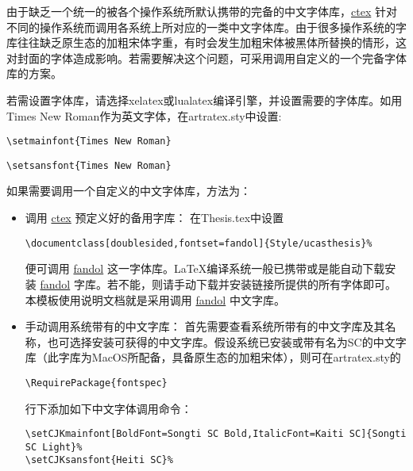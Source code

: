 \begin{enumerate}
        由于缺乏一个统一的被各个操作系统所默认携带的完备的中文字体库，\href{https://ctan.org/pkg/ctex?lang=en}{ctex} 针对不同的操作系统而调用各系统上所对应的一类中文字体库。由于很多操作系统的字库往往缺乏原生态的加粗宋体字重，有时会发生加粗宋体被黑体所替换的情形，这对封面的字体造成影响。若需要解决这个问题，可采用调用自定义的一个完备字体库的方案。
        
        若需设置字体库，请选择xelatex或lualatex编译引擎，并设置需要的字体库。如用Times New Roman作为英文字体，在artratex.sty中设置:

                 \verb|\setmainfont{Times New Roman}|

                 \verb|\setsansfont{Times New Roman}|

                 如果需要调用一个自定义的中文字体库，方法为：

                \begin{itemize}
                    \item 调用 \href{https://ctan.org/pkg/ctex?lang=en}{ctex} 预定义好的备用字库： 在Thesis.tex中设置

                        {
                            \small
                            \verb|\documentclass[doublesided,fontset=fandol]{Style/ucasthesis}%|
                         }

                         便可调用 \href{https://ctan.org/tex-archive/fonts/fandol?lang=en}{fandol} 这一字体库。\LaTeX{}编译系统一般已携带或是能自动下载安装 \href{https://ctan.org/tex-archive/fonts/fandol?lang=en}{fandol} 字库。若不能，则请手动下载并安装链接所提供的所有字体即可。本模板使用说明文档就是采用调用 \href{https://ctan.org/tex-archive/fonts/fandol?lang=en}{fandol} 中文字库。

                     \item 手动调用系统带有的中文字库： 首先需要查看系统所带有的中文字库及其名称，也可选择安装可获得的中文字库。假设系统已安装或带有名为SC的中文字库（此字库为MacOS所配备，具备原生态的加粗宋体），则可在artratex.sty的

                         \verb|\RequirePackage{fontspec}|

                        行下添加如下中文字体调用命令：
                        {
                            \scriptsize
\begin{verbatim}
\setCJKmainfont[BoldFont=Songti SC Bold,ItalicFont=Kaiti SC]{Songti SC Light}%
\setCJKsansfont{Heiti SC}%
\end{verbatim}
                        }
                \end{itemize}


\end{enumerate}
